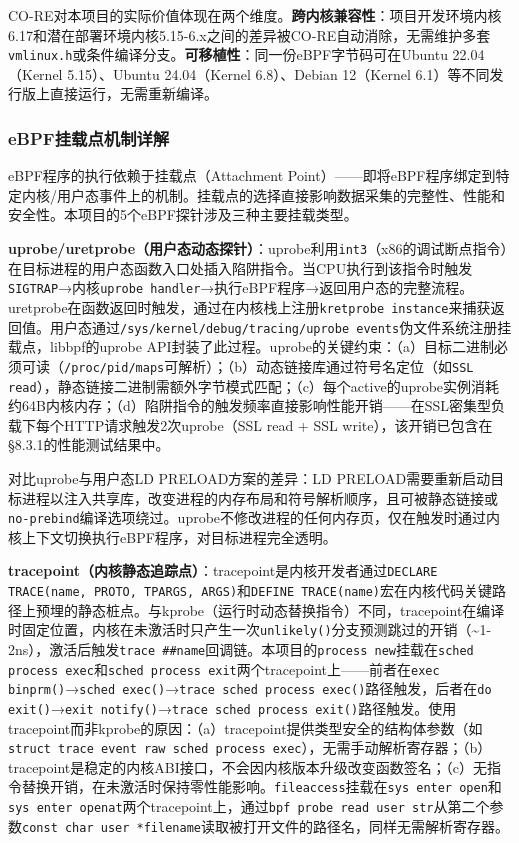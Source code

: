 \documentclass[a4paper]{ctexart}
\makeatletter
\renewcommand{\_}{%
  \ifmmode
    \nfss@text{\textunderscore}%
  \else
    \textunderscore\discretionary{}{}{}%
  \fi}
\makeatother
\begin{document}
CO-RE对本项目的实际价值体现在两个维度。\textbf{跨内核兼容性}：项目开发环境内核6.17和潜在部署环境内核5.15-6.x之间的差异被CO-RE自动消除，无需维护多套\texttt{vmlinux.h}或条件编译分支。\textbf{可移植性}：同一份eBPF字节码可在Ubuntu 22.04（Kernel 5.15）、Ubuntu 24.04（Kernel 6.8）、Debian 12（Kernel 6.1）等不同发行版上直接运行，无需重新编译。


\subsubsection{eBPF挂载点机制详解}



eBPF程序的执行依赖于挂载点（Attachment Point）——即将eBPF程序绑定到特定内核/用户态事件上的机制。挂载点的选择直接影响数据采集的完整性、性能和安全性。本项目的5个eBPF探针涉及三种主要挂载类型。


\textbf{uprobe/uretprobe（用户态动态探针）}：uprobe利用\texttt{int3}（x86的调试断点指令）在目标进程的用户态函数入口处插入陷阱指令。当CPU执行到该指令时触发\texttt{SIGTRAP}→内核\texttt{uprobe\_handler}→执行eBPF程序→返回用户态的完整流程。uretprobe在函数返回时触发，通过在内核栈上注册\texttt{kretprobe\_instance}来捕获返回值。用户态通过\texttt{/sys/kernel/debug/tracing/uprobe\_events}伪文件系统注册挂载点，libbpf的uprobe API封装了此过程。uprobe的关键约束：（a）目标二进制必须可读（\texttt{/proc/pid/maps}可解析）；（b）动态链接库通过符号名定位（如\texttt{SSL\_read}），静态链接二进制需额外字节模式匹配；（c）每个active的uprobe实例消耗约64B内核内存；（d）陷阱指令的触发频率直接影响性能开销——在SSL密集型负载下每个HTTP请求触发2次uprobe（SSL\_read + SSL\_write），该开销已包含在§8.3.1的性能测试结果中。


对比uprobe与用户态LD\_PRELOAD方案的差异：LD\_PRELOAD需要重新启动目标进程以注入共享库，改变进程的内存布局和符号解析顺序，且可被静态链接或\texttt{no-prebind}编译选项绕过。uprobe不修改进程的任何内存页，仅在触发时通过内核上下文切换执行eBPF程序，对目标进程完全透明。


\textbf{tracepoint（内核静态追踪点）}：tracepoint是内核开发者通过\texttt{DECLARE\_TRACE(name, PROTO, TPARGS, ARGS)}和\texttt{DEFINE\_TRACE(name)}宏在内核代码关键路径上预埋的静态桩点。与kprobe（运行时动态替换指令）不同，tracepoint在编译时固定位置，内核在未激活时只产生一次\texttt{unlikely()}分支预测跳过的开销（\textasciitilde{}1-2ns），激活后触发\texttt{trace\_\#\#name}回调链。本项目的\texttt{process\_new}挂载在\texttt{sched\_process\_exec}和\texttt{sched\_process\_exit}两个tracepoint上——前者在\texttt{exec\_binprm()}→\texttt{sched\_exec()}→\texttt{trace\_sched\_process\_exec()}路径触发，后者在\texttt{do\_exit()}→\texttt{exit\_notify()}→\texttt{trace\_sched\_process\_exit()}路径触发。使用tracepoint而非kprobe的原因：（a）tracepoint提供类型安全的结构体参数（如\texttt{struct trace\_event\_raw\_sched\_process\_exec}），无需手动解析寄存器；（b）tracepoint是稳定的内核ABI接口，不会因内核版本升级改变函数签名；（c）无指令替换开销，在未激活时保持零性能影响。\texttt{fileaccess}挂载在\texttt{sys\_enter\_open}和\texttt{sys\_enter\_openat}两个tracepoint上，通过\texttt{bpf\_probe\_read\_user\_str}从第二个参数\texttt{const char \_\_user *filename}读取被打开文件的路径名，同样无需解析寄存器。
\end{document}
